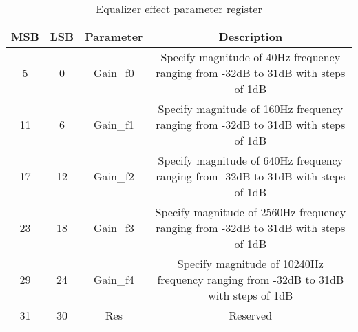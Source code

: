 \begin{table}[h!]
    \centering
    \begin{tabular}{|c|c|c|c|}
        \hline
        MSB & LSB & Parameter & Description\\
        \hline
        5 & 0 & Gain\_f0 & Specify magnitude of 40Hz frequency ranging from -32dB to 31dB with steps of 1dB\\
        \hline
        11 & 6 & Gain\_f1 & Specify magnitude of 160Hz frequency ranging from -32dB to 31dB with steps of 1dB\\
        \hline
        17 & 12 & Gain\_f2 & Specify magnitude of 640Hz frequency ranging from -32dB to 31dB with steps of 1dB\\
        \hline
        23 & 18 & Gain\_f3 & Specify magnitude of 2560Hz frequency ranging from -32dB to 31dB with steps of 1dB\\
        \hline
        29 & 24 & Gain\_f4 & Specify magnitude of 10240Hz frequency ranging from -32dB to 31dB with steps of 1dB\\
        \hline
        31 & 30 & Res & Reserved\\
        \hline
    \end{tabular}
    \caption{Equalizer effect parameter register}
    \label{table:eq-effect-parameters}
\end{table}




